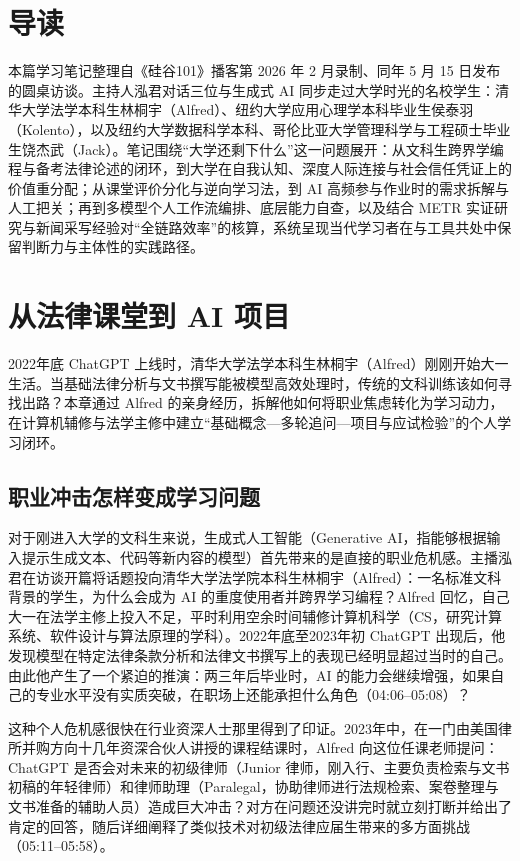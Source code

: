 \documentclass[UTF8,a4paper,11pt,fontset=fandol]{ctexart}
\begin{document}
\section*{导读}
本篇学习笔记整理自《硅谷101》播客第 2026 年 2 月录制、同年 5 月 15 日发布的圆桌访谈。主持人泓君对话三位与生成式 AI 同步走过大学时光的名校学生：清华大学法学本科生林桐宇（Alfred）、纽约大学应用心理学本科毕业生侯泰羽（Kolento），以及纽约大学数据科学本科、哥伦比亚大学管理科学与工程硕士毕业生饶杰武（Jack）。笔记围绕“大学还剩下什么”这一问题展开：从文科生跨界学编程与备考法律论述的闭环，到大学在自我认知、深度人际连接与社会信任凭证上的价值重分配；从课堂评价分化与逆向学习法，到 AI 高频参与作业时的需求拆解与人工把关；再到多模型个人工作流编排、底层能力自查，以及结合 METR 实证研究与新闻采写经验对“全链路效率”的核算，系统呈现当代学习者在与工具共处中保留判断力与主体性的实践路径。
\section{从法律课堂到 AI 项目}
2022年底 ChatGPT 上线时，清华大学法学本科生林桐宇（Alfred）刚刚开始大一生活。当基础法律分析与文书撰写能被模型高效处理时，传统的文科训练该如何寻找出路？本章通过 Alfred 的亲身经历，拆解他如何将职业焦虑转化为学习动力，在计算机辅修与法学主修中建立“基础概念—多轮追问—项目与应试检验”的个人学习闭环。
\subsection{职业冲击怎样变成学习问题}
对于刚进入大学的文科生来说，生成式人工智能（Generative AI，指能够根据输入提示生成文本、代码等新内容的模型）首先带来的是直接的职业危机感。主播泓君在访谈开篇将话题投向清华大学法学院本科生林桐宇（Alfred）：一名标准文科背景的学生，为什么会成为 AI 的重度使用者并跨界学习编程？Alfred 回忆，自己大一在法学主修上投入不足，平时利用空余时间辅修计算机科学（CS，研究计算系统、软件设计与算法原理的学科）。2022年底至2023年初 ChatGPT 出现后，他发现模型在特定法律条款分析和法律文书撰写上的表现已经明显超过当时的自己。由此他产生了一个紧迫的推演：两三年后毕业时，AI 的能力会继续增强，如果自己的专业水平没有实质突破，在职场上还能承担什么角色（04:06–05:08）？

这种个人危机感很快在行业资深人士那里得到了印证。2023年中，在一门由美国律所并购方向十几年资深合伙人讲授的课程结课时，Alfred 向这位任课老师提问：ChatGPT 是否会对未来的初级律师（Junior 律师，刚入行、主要负责检索与文书初稿的年轻律师）和律师助理（Paralegal，协助律师进行法规检索、案卷整理与文书准备的辅助人员）造成巨大冲击？对方在问题还没讲完时就立刻打断并给出了肯定的回答，随后详细阐释了类似技术对初级法律应届生带来的多方面挑战（05:11–05:58）。
\end{document}
